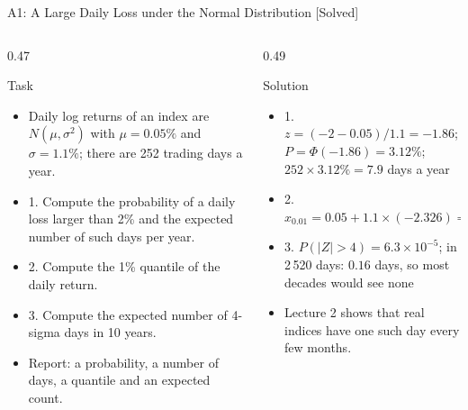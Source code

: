 \begin{frame}{A1: A Large Daily Loss under the Normal Distribution [Solved]}
\itemsize{\footnotesize}
\begin{columns}[T]
\begin{column}{0.47\textwidth}
\begin{block}{Task}
\begin{itemize}
    \item Daily log returns of an index are $N(\mu, \sigma^2)$ with $\mu = 0.05\%$ and $\sigma = 1.1\%$; there are 252 trading days a year.
    \item 1. Compute the probability of a daily loss larger than 2\% and the expected number of such days per year.
    \item 2. Compute the 1\% quantile of the daily return.
    \item 3. Compute the expected number of 4-sigma days in 10 years.
    \item Report: a probability, a number of days, a quantile and an expected count.
\end{itemize}
\end{block}
\end{column}
\begin{column}{0.49\textwidth}
\begin{exampleblock}{Solution}
\begin{itemize}
    \item 1. $z = (-2 - 0.05)/1.1 = -1.86$; $P = \Phi(-1.86) = 3.12\%$; $252 \times 3.12\% = 7.9$ days a year
    \item 2. $x_{0.01} = 0.05 + 1.1 \times (-2.326) = -2.51\%$
    \item 3. $P(|Z| > 4) = 6.3 \times 10^{-5}$; in 2\,520 days: $0.16$ days, so most decades would see none
    \item Lecture 2 shows that real indices have one such day every few months.
\end{itemize}
\end{exampleblock}
\end{column}
\end{columns}
\end{frame}

